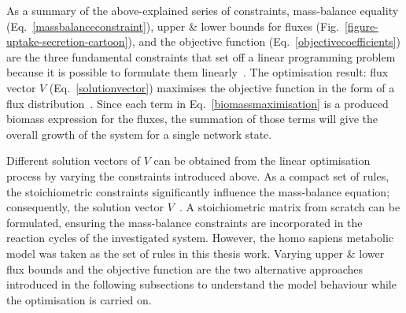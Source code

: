 

As a summary of the above-explained series of constraints, mass-balance equality (Eq.~\eqref{massbalanceconstraint}), upper \& lower bounds for fluxes (Fig.~\ref{figure-uptake-secretion-cartoon}), and the objective function (Eq.~\eqref{objectivecoefficients}) are the three fundamental constraints that set off a linear programming problem because it is possible to formulate them linearly~\cite{PRICE2004}. The optimisation result: flux vector $V$ (Eq.~\eqref{solutionvector}) maximises the objective function in the form of a flux distribution~\cite{KAUFFMAN2003491,PRICE2004}. Since each term in Eq.~\eqref{biomassmaximisation} is a produced biomass expression for the fluxes, the summation of those terms will give the overall growth of the system for a single network state.

Different solution vectors of $V$ can be obtained from the linear optimisation process by varying the constraints introduced above. As a compact set of rules, the stoichiometric constraints significantly influence the mass-balance equation; consequently, the solution vector $V$~\cite{Edwards2001}. A stoichiometric matrix from scratch can be formulated, ensuring the mass-balance constraints are incorporated in the reaction cycles of the investigated system. However, the homo sapiens metabolic model was taken as the set of rules in this thesis work. Varying upper \& lower flux bounds and the objective function are the two alternative approaches introduced in the following subsections to understand the model behaviour while the optimisation is carried on.
